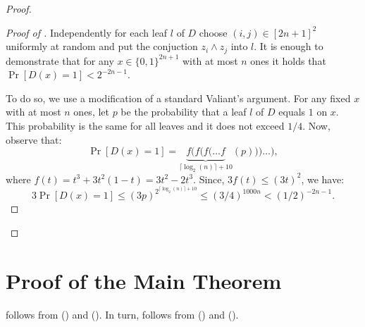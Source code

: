 \documentclass{toc}
\begin{document}
\begin{proof}
\begin{proof}[Proof of ]
Independently for each leaf $l$ of $D$ choose $(i, j) \in [2n + 1]^2$ uniformly at random and put the  conjuction $z_i \land z_j$ into $l$. It is enough to demonstrate that for any $x\in\{0, 1\}^{2n + 1}$ with at most $n$ ones it holds that $\Pr[D(x) = 1] < 2^{-2n - 1}$. 

To do so, we use a modification of a standard Valiant's argument. For any fixed $x$ with at most $n$ ones, let $p$ be the probability that a leaf $l$ of $D$ equals $1$ on $x$. This probability is the same for all leaves and it does not exceed $1/4$. Now, observe that:
\[\Pr[D(x) = 1] = \underbrace{f(f(f(\ldots f}_{\text{$\lceil\log_2(n)\rceil + 10$}}(p)))\ldots),\]
where $f(t) = t^3 + 3 t^2 (1 - t) = 3t^2 -2t^3$. Since, $3f(t) \le (3t)^2$, we have:
\[3\Pr[D(x) = 1] \le (3p)^{2^{\lceil\log_2(n)\rceil + 10}}\le (3/4)^{1000 n} < (1/2)^{-2n - 1}.\]
\end{proof}
\end{proof}





























\section{Proof of the Main Theorem} \label{sec:proof_main}

 follows from  () and  ().  In turn,  follows from  () and  (). 
\end{document}
